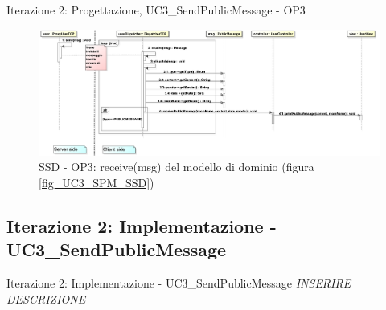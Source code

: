 \begin{frame} {Iterazione 2: Progettazione, UC3\_SendPublicMessage - OP3}
   \begin{figure}
     \includegraphics[scale=0.14]{image_astah/Iteration_2_DesignModel/UC3_SendPublicMessage_SSD_3_receiveMsg.png}{\centering}
     \caption{SSD - OP3: receive(msg) del modello di dominio (figura \ref{fig_UC3_SPM_SSD})}
     \label{fig_UC3_SSD_SRM_3} 
   \end{figure}
\end{frame}

\subsection{Iterazione 2: Implementazione - UC3\_SendPublicMessage}
\begin{frame} {Iterazione 2: Implementazione - UC3\_SendPublicMessage}
  \emph{INSERIRE DESCRIZIONE}
\end{frame}

